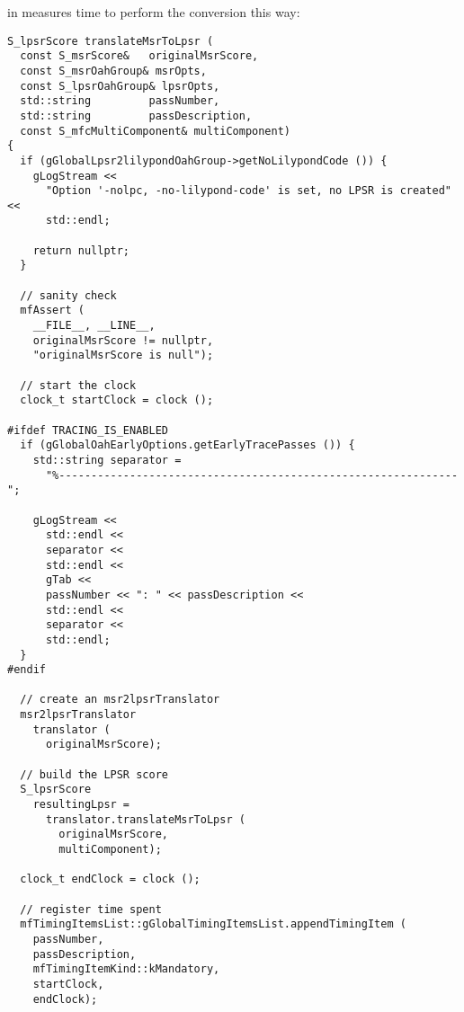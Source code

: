 \newpage

 in  measures time to perform the conversion this way:
\begin{lstlisting}[language=CPlusPlus]
S_lpsrScore translateMsrToLpsr (
  const S_msrScore&   originalMsrScore,
  const S_msrOahGroup& msrOpts,
  const S_lpsrOahGroup& lpsrOpts,
  std::string         passNumber,
  std::string         passDescription,
  const S_mfcMultiComponent& multiComponent)
{
  if (gGlobalLpsr2lilypondOahGroup->getNoLilypondCode ()) {
    gLogStream <<
      "Option '-nolpc, -no-lilypond-code' is set, no LPSR is created" <<
      std::endl;

    return nullptr;
  }

  // sanity check
  mfAssert (
    __FILE__, __LINE__,
    originalMsrScore != nullptr,
    "originalMsrScore is null");

  // start the clock
  clock_t startClock = clock ();

#ifdef TRACING_IS_ENABLED
  if (gGlobalOahEarlyOptions.getEarlyTracePasses ()) {
    std::string separator =
      "%--------------------------------------------------------------";

    gLogStream <<
      std::endl <<
      separator <<
      std::endl <<
      gTab <<
      passNumber << ": " << passDescription <<
      std::endl <<
      separator <<
      std::endl;
  }
#endif

  // create an msr2lpsrTranslator
  msr2lpsrTranslator
    translator (
      originalMsrScore);

  // build the LPSR score
  S_lpsrScore
    resultingLpsr =
      translator.translateMsrToLpsr (
        originalMsrScore,
        multiComponent);

  clock_t endClock = clock ();

  // register time spent
  mfTimingItemsList::gGlobalTimingItemsList.appendTimingItem (
    passNumber,
    passDescription,
    mfTimingItemKind::kMandatory,
    startClock,
    endClock);
\end{lstlisting}
